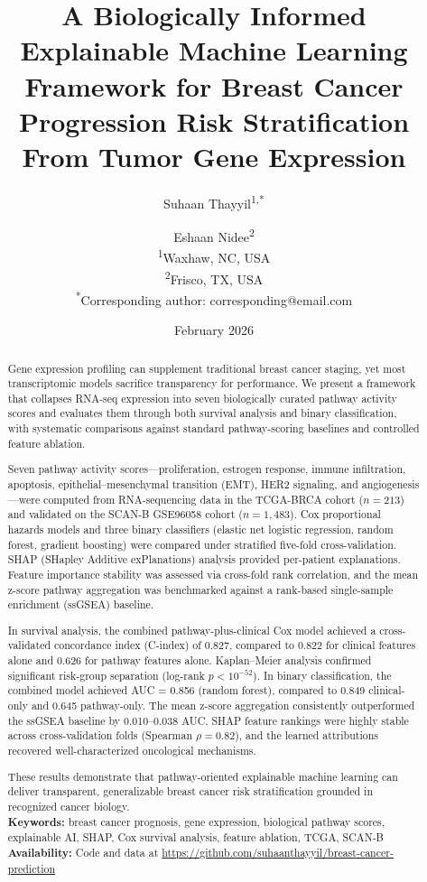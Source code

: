 \documentclass[11pt]{article}
\title{\textbf{A Biologically Informed Explainable Machine Learning Framework for Breast Cancer Progression Risk Stratification From Tumor Gene Expression}}
\author{
Suhaan Thayyil\textsuperscript{1,*} \and Eshaan Nidee\textsuperscript{2} \\[6pt]
\textsuperscript{1}Waxhaw, NC, USA \\
\textsuperscript{2}Frisco, TX, USA \\[4pt]
\textsuperscript{*}Corresponding author: corresponding@email.com
}
\date{February 2026}
\begin{document}
\maketitle

\begin{abstract}
\noindent
Gene expression profiling can supplement traditional breast cancer staging, yet most transcriptomic models sacrifice transparency for performance. We present a framework that collapses RNA-seq expression into seven biologically curated pathway activity scores and evaluates them through both survival analysis and binary classification, with systematic comparisons against standard pathway-scoring baselines and controlled feature ablation.

Seven pathway activity scores---proliferation, estrogen response, immune infiltration, apoptosis, epithelial--mesenchymal transition (EMT), HER2 signaling, and angiogenesis---were computed from RNA-sequencing data in the TCGA-BRCA cohort ($n = 213$) and validated on the SCAN-B GSE96058 cohort ($n = 1{,}483$). Cox proportional hazards models and three binary classifiers (elastic net logistic regression, random forest, gradient boosting) were compared under stratified five-fold cross-validation. SHAP (SHapley Additive exPlanations) analysis provided per-patient explanations. Feature importance stability was assessed via cross-fold rank correlation, and the mean z-score pathway aggregation was benchmarked against a rank-based single-sample enrichment (ssGSEA) baseline.

In survival analysis, the combined pathway-plus-clinical Cox model achieved a cross-validated concordance index (C-index) of 0.827, compared to 0.822 for clinical features alone and 0.626 for pathway features alone. Kaplan--Meier analysis confirmed significant risk-group separation (log-rank $p < 10^{-52}$). In binary classification, the combined model achieved AUC = 0.856 (random forest), compared to 0.849 clinical-only and 0.645 pathway-only. The mean z-score aggregation consistently outperformed the ssGSEA baseline by 0.010--0.038 AUC. SHAP feature rankings were highly stable across cross-validation folds (Spearman $\rho = 0.82$), and the learned attributions recovered well-characterized oncological mechanisms.

These results demonstrate that pathway-oriented explainable machine learning can deliver transparent, generalizable breast cancer risk stratification grounded in recognized cancer biology. \\[6pt]
\noindent\textbf{Keywords:} breast cancer prognosis, gene expression, biological pathway scores, explainable AI, SHAP, Cox survival analysis, feature ablation, TCGA, SCAN-B \\[4pt]
\noindent\textbf{Availability:} Code and data at \url{https://github.com/suhaanthayyil/breast-cancer-prediction}
\end{abstract}
\end{document}
